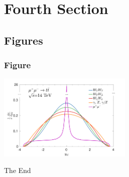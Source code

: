 \documentclass[aspectratio=169]{beamer}
\begin{document}
\section{Fourth Section}

\subsection{Figures}


\begin{frame}
\frametitle{Figure}

\centering
    \includegraphics[width=0.48\textwidth]{fig1}
\end{frame}


\begin{frame}
\Background
\Huge{\centerline{The End}}
\end{frame}

\end{document}
